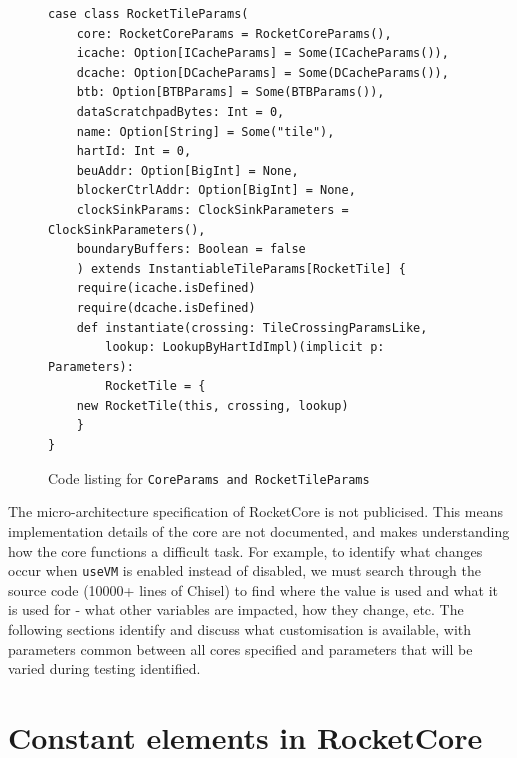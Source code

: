 \begin{figure}[h!]
    \begin{verbatim}
case class RocketTileParams(
    core: RocketCoreParams = RocketCoreParams(),
    icache: Option[ICacheParams] = Some(ICacheParams()),
    dcache: Option[DCacheParams] = Some(DCacheParams()),
    btb: Option[BTBParams] = Some(BTBParams()),
    dataScratchpadBytes: Int = 0,
    name: Option[String] = Some("tile"),
    hartId: Int = 0,
    beuAddr: Option[BigInt] = None,
    blockerCtrlAddr: Option[BigInt] = None,
    clockSinkParams: ClockSinkParameters = ClockSinkParameters(),
    boundaryBuffers: Boolean = false
    ) extends InstantiableTileParams[RocketTile] {
    require(icache.isDefined)
    require(dcache.isDefined)
    def instantiate(crossing: TileCrossingParamsLike, 
        lookup: LookupByHartIdImpl)(implicit p: Parameters): 
        RocketTile = {
    new RocketTile(this, crossing, lookup)
    }
}
    \end{verbatim}
    \caption{Code listing for \texttt{CoreParams and }\texttt{RocketTileParams}}
    \label{fig:tile_params}
\end{figure}

The micro-architecture specification of RocketCore is not publicised. This means implementation details of the core are not documented, and makes understanding how the core functions a difficult task. For example, to identify what changes occur when \texttt{useVM} is enabled instead of disabled, we must search through the source code (10000+ lines of Chisel\cite{chisel}) to find where the value is used and what it is used for - what other variables are impacted, how they change, etc. The following sections identify and discuss what customisation is available, with parameters common between all cores specified and parameters that will be varied during testing identified.

\section{Constant elements in RocketCore}
